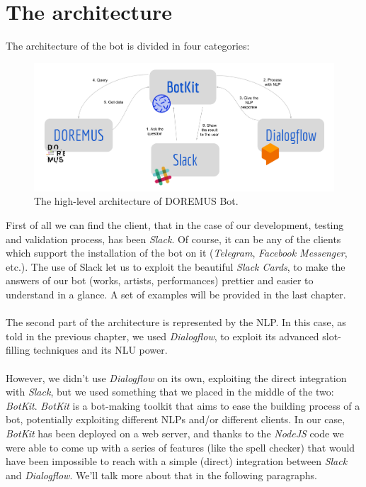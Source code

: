 \documentclass[a4paper,12pt]{report}
\begin{document}
	\section{The architecture}
	The architecture of the bot is divided in four categories:
	\begin{figure}[H]
		\centering
		\includegraphics[scale=0.2]{architecture}
		\caption{The high-level architecture of DOREMUS Bot.}
	\end{figure}
	First of all we can find the client, that in the case of our development, testing and validation process, has been \textit{Slack}. Of course, it can be any of the clients which support the installation of the bot on it (\textit{Telegram}, \textit{Facebook Messenger}, etc.). The use of Slack let us to exploit the beautiful \textit{Slack Cards}, to make the answers of our bot (works, artists, performances) prettier and easier to understand in a glance. A set of examples will be provided in the last chapter.\\\\
	The second part of the architecture is represented by the NLP. In this case, as told in the previous chapter, we used \textit{Dialogflow}, to exploit its advanced slot-filling techniques and its NLU power.\\\\
	However, we didn't use \textit{Dialogflow} on its own, exploiting the direct integration with \textit{Slack}, but we used something that we placed in the middle of the two: \textit{BotKit}. \textit{BotKit} is a bot-making toolkit that aims to ease the building process of a bot, potentially exploiting different NLPs and/or different clients. In our case, \textit{BotKit} has been deployed on a web server, and thanks to the \textit{NodeJS} code we were able to come up with a series of features (like the spell checker) that would have been impossible to reach with a simple (direct) integration between \textit{Slack} and \textit{Dialogflow}. We'll talk more about that in the following paragraphs.\\\\
\end{document}
